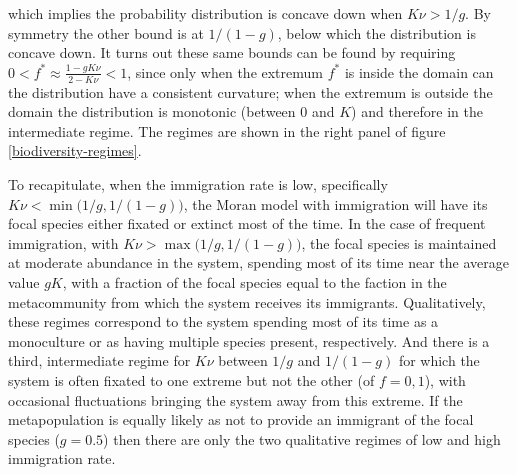 which implies the probability distribution is concave down when $K\nu > 1/g$. %
By symmetry the other bound is at $1/(1-g)$, below which the distribution is concave down. 
It turns out these same bounds can be found by requiring $0<f^*\approx\frac{1-g K\nu}{2-K\nu}<1$, since only when the extremum $f^*$ is inside the domain can the distribution have a consistent curvature; when the extremum is outside the domain the distribution is monotonic (between $0$ and $K$) and therefore in the intermediate regime. 
The regimes are shown in the right panel of figure \ref{biodiversity-regimes}. 


%
To recapitulate, when the immigration rate is low, specifically $K\nu < \min\big(1/g,1/(1-g)\big)$, the Moran model with immigration will have its focal species either fixated or extinct most of the time. 
In the case of frequent immigration, with $K\nu > \max\big(1/g,1/(1-g)\big)$, the focal species is maintained at moderate abundance in the system, spending most of its time near the average value $gK$, with a fraction of the focal species equal to the faction in the metacommunity from which the system receives its immigrants. 
Qualitatively, these regimes correspond to the system spending most of its time as a monoculture or as having multiple species present, respectively. 
And there is a third, intermediate regime for $K\nu$ between $1/g$ and $1/(1-g)$ for which the system is often fixated to one extreme but not the other (of $f=0,1$), with occasional fluctuations bringing the system away from this extreme. 
If the metapopulation is equally likely as not to provide an immigrant of the focal species ($g=0.5$) then there are only the two qualitative regimes of low and high immigration rate. %

